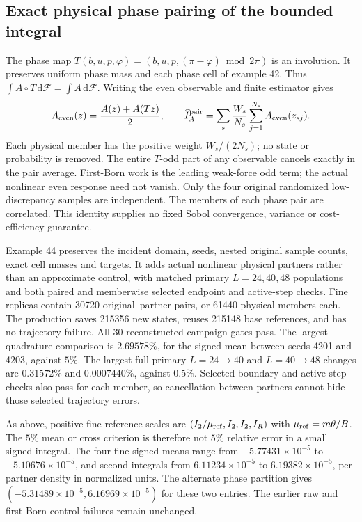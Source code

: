 \documentclass[11pt,letterpaper]{article}
\newcommand{\dd}{\mathrm d}
\begin{document}
\subsection*{Exact physical phase pairing of the bounded integral}
The phase map $T(b,u,p,\varphi)=(b,u,p,(\pi-\varphi)\bmod 2\pi)$ is
an involution. It preserves uniform phase mass and each phase cell of
example 42. Thus $\int A\circ T\,\dd\mathcal F=\int A\,\dd\mathcal F$.
Writing the even observable and finite estimator gives
\[
 A_{\rm even}(z)=\frac{A(z)+A(Tz)}{2},\qquad
 \widehat I_A^{\rm pair}=\sum_s\frac{W_s}{N_s}
                    \sum_{j=1}^{N_s}A_{\rm even}(z_{sj}).
\]
Each physical member has the positive weight $W_s/(2N_s)$; no state or
probability is removed. The entire $T$-odd part of any observable cancels
exactly in the pair average. First-Born work is the leading weak-force odd
term; the actual nonlinear even response need not vanish. Only the four
original randomized low-discrepancy samples are independent. The members
of each phase pair are correlated. This identity supplies no fixed Sobol
convergence, variance or cost-efficiency guarantee.

Example 44 preserves the incident domain, seeds, nested original sample
counts, exact cell masses and targets. It adds actual nonlinear physical
partners rather than an approximate control, with matched primary
$L=24,40,48$ populations and both paired and memberwise selected endpoint
and active-step checks. Fine replicas contain 30720 original--partner pairs,
or 61440 physical members each. The production saves 215356 new states,
reuses 215148 base references, and has no trajectory failure. All 30
reconstructed campaign gates pass. The largest quadrature comparison is
$2.69578\%$, for the signed mean between seeds 4201 and 4203, against $5\%$.
The largest full-primary $L=24\to40$ and $L=40\to48$ changes are
$0.31572\%$ and $0.0007440\%$, against $0.5\%$. Selected boundary and
active-step checks also pass for each member, so cancellation between
partners cannot hide those selected trajectory errors.

As above, positive fine-reference scales are
$(I_2/\mu_{\rm ref},I_2,I_2,I_R)$ with $\mu_{\rm ref}=m\theta/B$.
The $5\%$ mean or cross criterion is therefore not $5\%$ relative error
in a small signed integral. The four fine signed means range from
$-5.77431\times10^{-5}$ to $-5.10676\times10^{-5}$, and second integrals
from $6.11234\times10^{-5}$ to $6.19382\times10^{-5}$, per partner density
in normalized units. The alternate phase partition gives
$(-5.31489\times10^{-5},6.16969\times10^{-5})$ for these two entries.
The earlier raw and first-Born-control failures remain unchanged.
\end{document}
